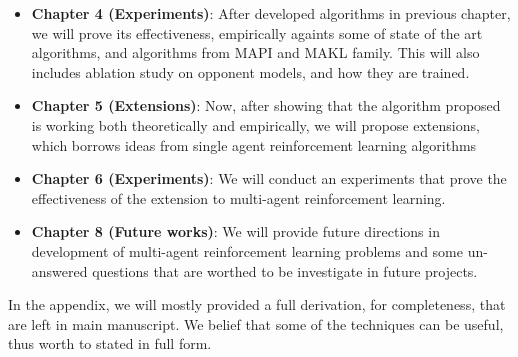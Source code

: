 \begin{itemize}
    \item \textbf{Chapter 4 (Experiments)}: After developed algorithms in previous chapter, we will prove its effectiveness, empirically againts some of state of the art algorithms, and algorithms from MAPI and MAKL family. This will also includes ablation study on opponent models, and how they are trained.
    \item \textbf{Chapter 5 (Extensions)}: Now, after showing that the algorithm proposed is working both theoretically and empirically, we will propose extensions, which borrows ideas from single agent reinforcement learning algorithms
    \item \textbf{Chapter 6 (Experiments)}: We will conduct an experiments that prove the effectiveness of the extension to multi-agent reinforcement learning.
    \item \textbf{Chapter 8 (Future works)}: We will provide future directions in development of multi-agent reinforcement learning problems and some un-answered questions that are worthed to be investigate in future projects. 
\end{itemize}
In the appendix, we will mostly provided a full derivation, for completeness, that are left in main manuscript. We belief that some of the techniques can be useful, thus worth to stated in full form.